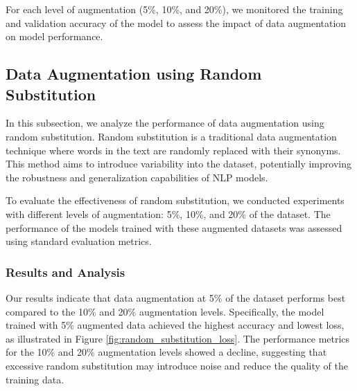 \documentclass{article}
\begin{document}
For each level of augmentation (5\%, 10\%, and 20\%), we monitored the training
and validation accuracy of the model to assess the impact of data augmentation
on model performance.

\subsection{Data Augmentation using Random Substitution}

In this subsection, we analyze the performance of data augmentation using
random substitution. Random substitution is a traditional data augmentation
technique where words in the text are randomly replaced with their synonyms.
This method aims to introduce variability into the dataset, potentially
improving the robustness and generalization capabilities of NLP models.

To evaluate the effectiveness of random substitution, we conducted experiments
with different levels of augmentation: 5\%, 10\%, and 20\% of the dataset. The
performance of the models trained with these augmented datasets was assessed
using standard evaluation metrics.

\subsubsection{Results and Analysis}
Our results indicate that data augmentation at 5\% of the dataset performs best
compared to the 10\% and 20\% augmentation levels. Specifically, the model
trained with 5\% augmented data achieved the highest accuracy and lowest loss,
as illustrated in Figure \ref{fig:random_substitution_loss}. The performance
metrics for the 10\% and 20\% augmentation levels showed a decline, suggesting
that excessive random substitution may introduce noise and reduce the quality
of the training data.
\end{document}
